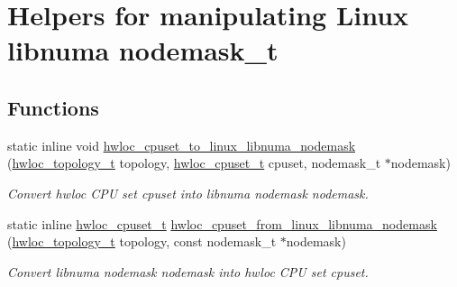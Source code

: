 \hypertarget{group__hwlocality__linux__libnuma__nodemask}{
\section{Helpers for manipulating Linux libnuma nodemask\_\-t}
\label{group__hwlocality__linux__libnuma__nodemask}
}
\subsection*{Functions}
\begin{DoxyCompactItemize}
\item 
static inline void \hyperlink{group__hwlocality__linux__libnuma__nodemask_gad6c037010e89674b799ed8131d7a632c}{hwloc\_\-cpuset\_\-to\_\-linux\_\-libnuma\_\-nodemask} (\hyperlink{group__hwlocality__topology_ga9d1e76ee15a7dee158b786c30b6a6e38}{hwloc\_\-topology\_\-t} topology, \hyperlink{group__hwlocality__cpuset_ga7366332f7090f5b54d4b25a0c2c4b411}{hwloc\_\-cpuset\_\-t} cpuset, nodemask\_\-t $\ast$nodemask)
\begin{DoxyCompactList}\small\item\em Convert hwloc CPU set {\ttfamily cpuset} into libnuma nodemask {\ttfamily nodemask}. \item\end{DoxyCompactList}\item 
static inline \hyperlink{group__hwlocality__cpuset_ga7366332f7090f5b54d4b25a0c2c4b411}{hwloc\_\-cpuset\_\-t} \hyperlink{group__hwlocality__linux__libnuma__nodemask_gac199bbdcd7913ce17bd36a168e00991f}{hwloc\_\-cpuset\_\-from\_\-linux\_\-libnuma\_\-nodemask} (\hyperlink{group__hwlocality__topology_ga9d1e76ee15a7dee158b786c30b6a6e38}{hwloc\_\-topology\_\-t} topology, const nodemask\_\-t $\ast$nodemask)
\begin{DoxyCompactList}\small\item\em Convert libnuma nodemask {\ttfamily nodemask} into hwloc CPU set {\ttfamily cpuset}. \item\end{DoxyCompactList}\end{DoxyCompactItemize}



